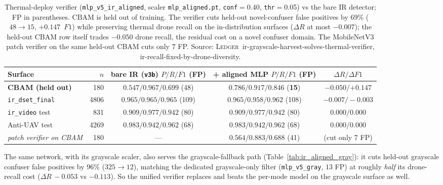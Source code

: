 \documentclass[12pt,a4paper,oneside,openright]{book}
\begin{document}
\begin{table}[htbp]
    \centering
    \caption{Thermal-deploy verifier (\texttt{mlp\_v5\_ir\_aligned}, scaler \texttt{mlp\_aligned.pt}, \texttt{conf}$=$0.40, \texttt{thr}$=$0.05) vs the bare IR detector; FP in parentheses. CBAM is held out of training. The verifier cuts held-out novel-confuser false positives by $69\%$ ($48\to15$, $+0.147$~$F1$) while preserving thermal drone recall on the in-distribution surfaces ($\Delta R$ at most $-0.007$); the held-out CBAM row itself trades $-0.050$ drone recall, the residual cost on a novel confuser domain. The MobileNetV3 patch verifier on the same held-out CBAM cuts only $7$ FP. Source: \textsc{Ledger}~ir-grayscale-harvest-solves-thermal-verifier, ir-recall-fixed-by-drone-diversity.}
    \label{tab:ir_aligned}
    \begin{tabular}{lrccc}
        \toprule
        Surface & $n$ & bare IR (\texttt{v3b}) $P/R/F1$ (FP) & + aligned MLP $P/R/F1$ (FP) & $\Delta R / \Delta F1$ \\
        \midrule
        \textbf{CBAM (held out)}  & 180  & $0.547/0.967/0.699$ (48) & $\mathbf{0.786/0.917/0.846}$ (\textbf{15}) & $-0.050 / \mathbf{+0.147}$ \\
        \texttt{ir\_dset\_final}  & 4806 & $0.965/0.965/0.965$ (109) & $0.965/0.958/0.962$ (108) & $-0.007 / -0.003$ \\
        \texttt{ir\_video} test   & 831  & $0.909/0.977/0.942$ (80) & $0.909/0.977/0.942$ (80) & $0.000 / 0.000$ \\
        Anti-UAV test             & 4269 & $0.983/0.942/0.962$ (68) & $0.983/0.942/0.962$ (68) & $0.000 / 0.000$ \\
        \midrule
        \emph{patch verifier on CBAM} & 180 & --- & $0.564/0.883/0.688$ (41) & (cut only 7 FP) \\
        \bottomrule
    \end{tabular}
\end{table}

The same network, with its grayscale scaler, also serves the grayscale-fallback path (Table~\ref{tab:ir_aligned_gray}): it cuts held-out grayscale confuser false positives by $96\%$ ($325\to12$), matching the dedicated grayscale-only filter (\texttt{mlp\_v5\_gray}, $13$ FP) at roughly \emph{half} its drone-recall cost ($\Delta R\,{-}0.053$ vs $-0.113$). So the unified verifier replaces and beats the per-mode model on the grayscale surface as well.
\end{document}
